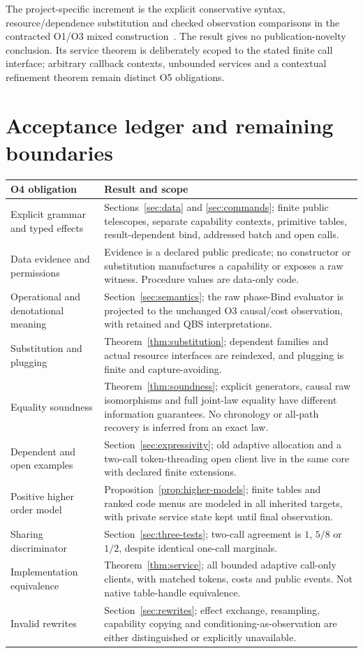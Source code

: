 \documentclass[11pt,a4paper]{article}
\theoremstyle{definition}
\begin{document}
The project-specific increment is the explicit conservative syntax,
resource/dependence substitution and checked observation comparisons in
the contracted O1/O3 mixed construction~\cite{O1,O3}. The result gives no
publication-novelty conclusion. Its service theorem is deliberately scoped
to the stated finite call interface; arbitrary callback contexts,
unbounded services and a contextual refinement theorem remain distinct
O5 obligations.

\section{Acceptance ledger and remaining boundaries}\label{sec:acceptance}
\begin{longtable}{@{}p{}p{}@{}}
\toprule
O4 obligation&Result and scope\\
\midrule
\endhead
Explicit grammar and typed effects&Sections~\ref{sec:data} and
\ref{sec:commands}; finite public telescopes, separate capability contexts,
primitive tables, result-dependent bind, addressed batch and open calls.\\
Data evidence and permissions&Evidence is a declared public predicate;
no constructor or substitution manufactures a capability or exposes a raw
witness. Procedure values are data-only code.\\
Operational and denotational meaning&Section~\ref{sec:semantics}; the raw
phase-Bind evaluator is projected to the unchanged O3 causal/cost
observation, with retained and QBS interpretations.\\
Substitution and plugging&Theorem~\ref{thm:substitution}; dependent
families and actual resource interfaces are reindexed, and plugging is
finite and capture-avoiding.\\
Equality soundness&Theorem~\ref{thm:soundness}; explicit generators,
causal raw isomorphisms and full joint-law equality have different
information guarantees. No chronology or all-path recovery is inferred
from an exact law.\\
Dependent and open examples&Section~\ref{sec:expressivity}; old adaptive
allocation and a two-call token-threading open client live in the same core
with declared finite extensions.\\
Positive higher order model&Proposition~\ref{prop:higher-models}; finite
tables and ranked code menus are modeled in all inherited targets, with
private service state kept until final observation.\\
Sharing discriminator&Section~\ref{sec:three-tests}; two-call agreement is
$1$, $5/8$ or $1/2$, despite identical one-call marginals.\\
Implementation equivalence&Theorem~\ref{thm:service}; all bounded adaptive
call-only clients, with matched tokens, costs and public events. Not
native table-handle equivalence.\\
Invalid rewrites&Section~\ref{sec:rewrites}; effect exchange, resampling,
capability copying and conditioning-as-observation are either distinguished
or explicitly unavailable.\\
\bottomrule
\end{longtable}
\end{document}
